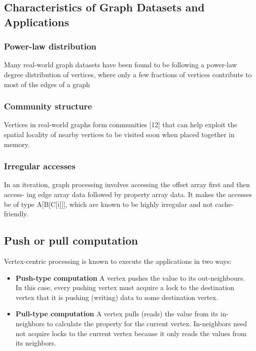 \documentclass[a4paper,12pt, final]{report}
\begin{document}
\subsection{Characteristics of Graph Datasets and Applications}
\subsubsection{Power-law distribution}
Many real-world graph datasets have been found to be following a power-law degree
distribution of vertices, where only a few fractions of vertices contribute to most of the
edges of a graph

\subsubsection{Community structure}
Vertices in real-world graphs form communities [12] that can help exploit the spatial
locality of nearby vertices to be visited soon when placed together in memory.


\subsubsection{Irregular accesses}
In an iteration, graph processing involves accessing the offset array first and then access-
ing edge array data followed by property array data. It makes the accesses be of type
A[B[C[i]]], which are known to be highly irregular and not cache-friendly.

\subsection{Push or pull computation}
Vertex-centric processing is known to execute the applications in two ways:

\begin{itemize}
    \setlength\itemsep{0 em}
    \item \textbf{Push-type computation} A vertex pushes the value to its out-neighbours. In this case, every pushing vertex must acquire a lock to the destination vertex that it is pushing (writing) data to some destination vertex.

    \item \textbf{Pull-type computation} A vertex pulls (reads) the value from its in-neighbors to calculate the property for the current vertex. In-neighbors need not acquire locks to the current vertex because it only reads the values from its neighbors.
\end{itemize}
\end{document}
